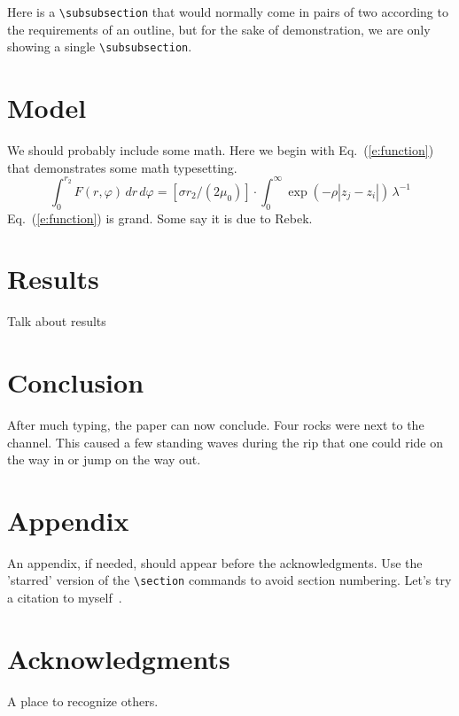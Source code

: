 \documentclass[]{aiaa-tc}%
\begin{document}
Here is a \verb|\subsubsection| that would normally come in pairs of two
according to the requirements of an outline, but for the sake of
demonstration, we are only showing a single \verb|\subsubsection|.

\section{Model}

We should probably include some math.
Here we begin with Eq.~(\ref{e:function}) that demonstrates some math
typesetting.
\begin{equation}
 \label{e:function}
 \int_{0}^{r_{2}} F(r,\varphi) \, dr \, d\varphi =
    \left[ \sigma r_{2}/(2\mu_{0}) \right] \cdot
    \int_{0}^{\infty} \exp(-\rho|z_{j}-z_{i}|) \, \lambda^{-1} 
\end{equation}
Eq.~(\ref{e:function}) is grand.
Some say it is due to Rebek.\cite{rebek:82bk}

\section{Results}
Talk about results
\section{Conclusion}

After much typing, the paper can now conclude.
Four rocks were next to the channel.
This caused a few standing waves during the rip that one could ride on
the way in or jump on the way out.

\section*{Appendix}

An appendix, if needed, should appear before the acknowledgments.
Use the 'starred' version of the \verb|\section| commands to avoid
section numbering.
Let's try a citation to myself~\cite{kulumani2015}.

\section*{Acknowledgments}

A place to recognize others.

 

\end{document}
